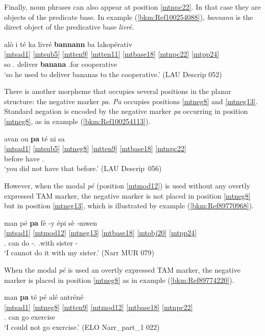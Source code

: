 \documentclass[output=paper]{langscibook}
\begin{document}
Finally, noun phrases can also appear at position \ref{mtnpc22}. In that case they are objects of the predicate base. In example (\ref{bkm:Ref100254088}), \textit{bannann} is the direct object of the predicative base \textit{livré}.

\ea\label{bkm:Ref100254088} 
\glll alò i té ka livré \textbf{bannann} ba lakopérativ\\
\ref{mtsad1} \ref{mtsub5} \ref{mtten9} \ref{mtten11} \ref{mtbase18} \ref{mtnpc22} \ref{mtpp24} {}\\
so \Third\Sg.\Sarg{} \Pst{} \Impf{} deliver \textbf{banana} \Prep{}.for cooperative\\
\glt `so he used to deliver bananas to the cooperative.' (LAU Descrip 052)
\z

There is another morpheme that occupies several positions in the planar structure: the negative marker \textit{pa}. \textit{Pa} occupies positions \ref{mtneg8} and \ref{mtneg13}. Standard negation is encoded by the negative marker \textit{pa} occurring in position \ref{mtneg8}, as in example (\ref{bkm:Ref100254113}).


\ea\label{bkm:Ref100254113}
\glll avan ou \textbf{pa} té ni sa\\
\ref{mtsad1} \ref{mtsub5} \ref{mtneg8} \ref{mtten9} \ref{mtbase18} \ref{mtnpc22} \\ 
before \Second\Sg{} \textbf{\Neg{}} \Pst{} have \Dem{}.\Pr{}\\
\glt `you did not have that before.' (LAU Descrip~056)
\z

However, when the modal \textit{pé} (position \ref{mtmod12}) is used without any overtly expressed TAM marker, the negative marker is not placed in position \ref{mtneg8} but in position \ref{mtneg13}, which is illustrated by example (\ref{bkm:Ref89770968}).

\ea\label{bkm:Ref89770968}
\glll man pé \textbf{pa} fè -y épi sè -mwen\\
\ref{mtsad1} \ref{mtmod12} \ref{mtneg13} \ref{mtbase18} \ref{mtobj20} \ref{mtpp24} {} {} \\
\First\Sg.\Sarg{} can \textbf{\Neg{}} do -\Third\Sg.\Obj{} \Prep{}.with sister -\First\Sg{}\\
\glt `I cannot do it with my sister.' (Narr MUR 079)
\z

When the modal \textit{pé} is used an overtly expressed TAM marker, the negative marker is placed in position \ref{mtneg8} as in example (\ref{bkm:Ref89774220}).

\ea\label{bkm:Ref89774220}
\glll man \textbf{pa} té pé alé antréné\\
\ref{mtsad1} \ref{mtneg8} \ref{mtten9} \ref{mtmod12} \ref{mtbase18} \ref{mtnpc22} \\
\First\Sg.\Sarg{} \textbf{\Neg{}} \Pst{} can go exercise\\
\glt `I could not go exercise.' (ELO Narr\_part\_1 022)
\z
\end{document}
